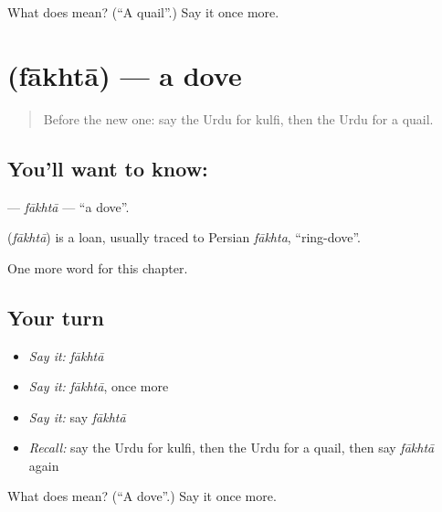 \begin{tcolorbox}[breakable,colback=teal!4,colframe=teal!35!black,title={Before you move on}]
What does  mean? (\textquotedblleft{}A quail\textquotedblright{}.) Say it once more.
\end{tcolorbox}
\section[\texorpdfstring{\ur{فاختہ} (fākhtā)}{فاختہ (fākhtā)}]{ (fākhtā) — a dove}

\label{lesson:UR-C175-fakhta}



\begin{quote}
Before the new one: say the Urdu for kulfi, then the Urdu for a quail.
\end{quote}

\subsection*{You'll want to know: }
\textbf{} — \emph{fākhtā} — \textquotedblleft{}a dove\textquotedblright{}.

\begin{cousinweb}
\textbf{} (\emph{fākhtā}) is a loan, usually traced to Persian \emph{fākhta}, \textquotedblleft{}ring-dove\textquotedblright{}.
\end{cousinweb}

\begin{grammarlens}[title={What you've built}]
One more word for this chapter.
\end{grammarlens}

\subsection*{Your turn}
\begin{itemize}
\raggedright
  \item \emph{Say it:} \emph{fākhtā}
  \item \emph{Say it:} \emph{fākhtā}, once more
  \item \emph{Say it:} say \emph{fākhtā}
  \item \emph{Recall:} say the Urdu for kulfi, then the Urdu for a quail, then say \emph{fākhtā} again
\end{itemize}

\begin{tcolorbox}[breakable,colback=teal!4,colframe=teal!35!black,title={Before you move on}]
What does  mean? (\textquotedblleft{}A dove\textquotedblright{}.) Say it once more.
\end{tcolorbox}
